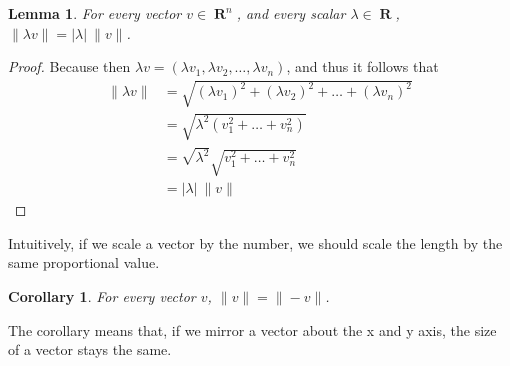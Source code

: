 \documentclass{report}
\newtheorem{lemma}[theorem]{Lemma}
\newtheorem{corollary}[theorem]{Corollary}
\DeclareMathOperator{\real}{\mathbf{R}}
\begin{document}
\begin{lemma}
  For every vector $v \in \real^n$, and every scalar $\lambda \in \real$, $\| \lambda v \| = | \lambda |\ \| v \|$.
\end{lemma}
\begin{proof}
  Because then $\lambda v = (\lambda v_1, \lambda v_2, \dots, \lambda v_n)$, and thus it follows that
  \begin{align*}
    \| \lambda v \| &= \sqrt{(\lambda v_1)^2 + (\lambda v_2)^2 + \dots + (\lambda v_n)^2}\\
                    &= \sqrt{\lambda^2(v_1^2 + \dots + v_n^2)}\\
                    &= \sqrt{\lambda^2} \sqrt{v_1^2 + \dots + v_n^2}\\
                    &= | \lambda |\ \| v \|
  \end{align*}
\end{proof}

Intuitively, if we scale a vector by the number, we should scale the length by the same proportional value.

\begin{center}
\end{center}

\begin{corollary}
  For every vector $v$, $\| v \| = \| -v \|$.
\end{corollary}

The corollary means that, if we mirror a vector about the x and y axis, the size of a vector stays the same.

\begin{center}
\end{center}
\end{document}
